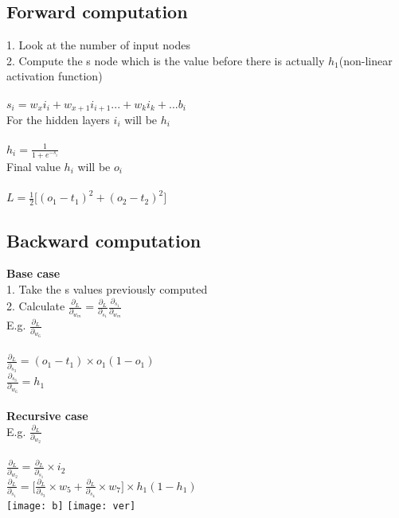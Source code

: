\documentclass[11pt]{article}
\begin{document}
\begin{multicols*}{3}
\subsection*{Forward computation}
1. Look at the number of input nodes\\
2. Compute the s node which is the value before there is actually $h_{1}$(non-linear activation function)\\\\
$s_{i} = w_{x}i_{i} + w_{x+1}i_{i+1} ... + w_{k}i_{k} + ... b_{i}$\\
For the hidden layers $i_{i}$ will be $h_{i}$\\\\
$h_{i} = \frac{1}{1 + e^{-s_{i}}}$\\
Final value $h_{i}$ will be $o_{i}$
\\\\
$L = \frac{1}{2} \big[ (o_{1} - t_{1})^2 +  (o_{2} - t_{2})^2 \big]$\\
\subsection*{Backward computation}
\textbf{Base case}\\
1. Take the s values previously computed \\
2. Calculate $\frac{\partial_{L}}{\partial_{w_{m}}} =  \frac{\partial_{L}}{\partial_{s_{1}}}\frac{\partial_{s_{1}}}{\partial_{w_{m}}}$\\
	E.g. $\frac{\partial_{L}}{\partial_{w_{6}}}$\\
	\\$\frac{\partial_{L}}{\partial_{s_{3}}}= (o_{1} - t_{1}) \times o_{1}(1 - o_{1})$\\
$\frac{\partial_{s_{3}}}{\partial_{w_{6}}} = h_{1}$\\\\
\textbf{Recursive case}\\
E.g. $\frac{\partial_{L}}{\partial_{w_{2}}}$\\
\\$\frac{\partial_{L}}{\partial_{w_{2}}}= \frac{\partial_{L}}{\partial_{s_{1}}} \times i_{2}$\\
$\frac{\partial_{L}}{\partial_{s_{1}}} = \big[\frac{\partial_{L}}{\partial_{s_{3}}} \times w_{5} + \frac{\partial_{L}}{\partial_{s_{4}}} \times w_{7} \big] \times h_{1}(1 - h_{1})$\\
\texttt{[image: b]}
\texttt{[image: ver]}
\end{multicols*}
\end{document}
